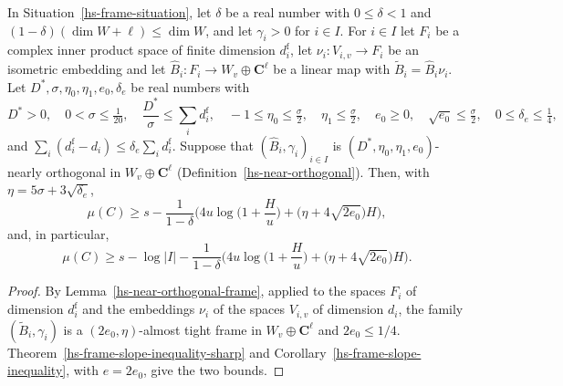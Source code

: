 \begin{corollary}\label{hs-frame-from-near-orthogonality}
In Situation~\ref{hs-frame-situation}, let $\delta$ be a real number with $0\leq\delta<1$ and
$(1-\delta)(\dim W+\ell)\leq\dim W$, and let $\gamma_i>0$ for $i\in I$. For $i\in I$ let $F_i$ be a
complex inner product space of finite dimension $d_i^{\mathrm f}$, let
$\nu_i:V_{i,v}\to F_i$ be an isometric embedding and let
$\hat B_i:F_i\to W_v\oplus\mathbf C^\ell$ be a linear map with $\tilde B_i=\hat B_i\nu_i$. Let
$D^*,\sigma,\eta_0,\eta_1,e_0,\delta_e$ be real numbers with
\[
 D^*>0,\quad 0<\sigma\leq\tfrac1{20},\quad \frac{D^*}{\sigma}\leq\sum_id_i^{\mathrm f},\quad
 -1\leq\eta_0\leq\tfrac\sigma2,\quad \eta_1\leq\tfrac\sigma2,\quad e_0\geq0,\quad
 \sqrt{e_0}\leq\tfrac\sigma2,\quad 0\leq\delta_e\leq\tfrac14,
\]
and $\sum_i(d_i^{\mathrm f}-d_i)\leq\delta_e\sum_id_i^{\mathrm f}$. Suppose that
$(\hat B_i,\gamma_i)_{i\in I}$ is $(D^*,\eta_0,\eta_1,e_0)$-nearly orthogonal in
$W_v\oplus\mathbf C^\ell$ (Definition~\ref{hs-near-orthogonal}). Then, with
$\eta=5\sigma+3\sqrt{\delta_e}$,
\[
 \mu(C)\geq s-\frac1{1-\delta}\Big(4u\log\Big(1+\frac Hu\Big)+\big(\eta+4\sqrt{2e_0}\big)H\Big),
\]
and, in particular,
\[
 \mu(C)\geq s-\log|I|-\frac1{1-\delta}\Big(4u\log\Big(1+\frac Hu\Big)+\big(\eta+4\sqrt{2e_0}\big)H\Big).
\]
\end{corollary}

\begin{proof}
By Lemma~\ref{hs-near-orthogonal-frame}, applied to the spaces $F_i$ of dimension
$d_i^{\mathrm f}$ and the embeddings $\nu_i$ of the spaces $V_{i,v}$ of dimension $d_i$, the family
$(\tilde B_i,\gamma_i)$ is a $(2e_0,\eta)$-almost tight frame in $W_v\oplus\mathbf C^\ell$ and
$2e_0\leq1/4$. Theorem~\ref{hs-frame-slope-inequality-sharp} and
Corollary~\ref{hs-frame-slope-inequality}, with $e=2e_0$, give the two bounds.
\end{proof}

